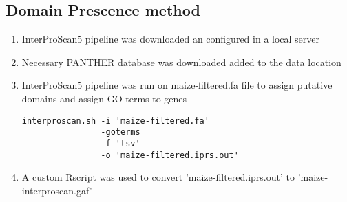 \documentclass[11pt,letterpaper]{article}
\begin{document}
  \subsection{Domain Prescence method}
  \begin{enumerate}
    \item InterProScan5 pipeline was downloaded an configured in a local server
    \item Necessary PANTHER database was downloaded added to the data location
    \item InterProScan5 pipeline was run on maize-filtered.fa file to assign putative domains and assign GO terms to genes \\
    \begin{verbatim}
interproscan.sh -i 'maize-filtered.fa'
                -goterms
                -f 'tsv'
                -o 'maize-filtered.iprs.out'
    \end{verbatim}
    \item A custom Rscript was used to convert 'maize-filtered.iprs.out' to 'maize-interproscan.gaf'
  \end{enumerate}
\end{document}
